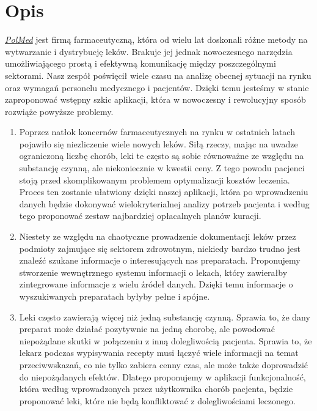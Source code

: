 \documentclass[12pt, a4paper]{article}
\begin{document}
\section{Opis}
\textit{\href{https://polmed.pl}{PolMed}} jest firmą farmaceutyczną,
która od wielu lat doskonali różne metody na wytwarzanie
i dystrybucję leków. Brakuje jej jednak nowoczesnego narzędzia
umożliwiającego prostą i efektywną komunikację między poszczególnymi
sektorami. Nasz zespół poświęcił wiele czasu na analizę obecnej
sytuacji na rynku oraz wymagań personelu medycznego i pacjentów.
Dzięki temu jesteśmy w stanie zaproponować wstępny szkic aplikacji,
która w nowoczesny i rewolucyjny sposób rozwiąże powyższe problemy.
\begin{enumerate}
    \item Poprzez natłok koncernów farmaceutycznych na rynku w ostatnich latach
      pojawiło się niezliczenie wiele nowych leków. Siłą rzeczy, mając na
      uwadze ograniczoną liczbę chorób, leki te często są sobie równoważne ze
      względu na substancję czynną, ale niekoniecznie w kwestii ceny. Z tego
      powodu pacjenci stoją przed skomplikowanym problemem optymalizacji
      kosztów leczenia. Proces ten zostanie ułatwiony dzięki naszej aplikacji,
      która po wprowadzeniu danych będzie dokonywać wielokryterialnej analizy
      potrzeb pacjenta i według tego proponować zestaw najbardziej opłacalnych
      planów kuracji.
    \item Niestety ze względu na chaotyczne prowadzenie dokumentacji leków
      przez podmioty zajmujące się sektorem zdrowotnym, niekiedy bardzo trudno
      jest znaleźć szukane informacje o interesujących nas preparatach.
      Proponujemy stworzenie wewnętrznego systemu informacji o lekach, który
      zawierałby zintegrowane informacje z wielu źródeł danych. Dzięki temu
      informacje o wyszukiwanych preparatach byłyby pełne i spójne.
    \item Leki często zawierają więcej niż jedną substancję czynną. Sprawia to,
      że dany preparat może działać pozytywnie na jedną chorobę, ale powodować
      niepożądane skutki w połączeniu z inną dolegliwością pacjenta. Sprawia
      to, że lekarz podczas wypisywania recepty musi łączyć wiele informacji na
      temat przeciwwskazań, co nie tylko zabiera cenny czas, ale może także
      doprowadzić do niepożądanych efektów. Dlatego proponujemy w aplikacji
      funkcjonalność, która według wprowadzonych przez użytkownika chorób
      pacjenta, będzie proponować leki, które nie będą konfliktować
      z dolegliwościami leczonego.

\end{enumerate}
\end{document}
